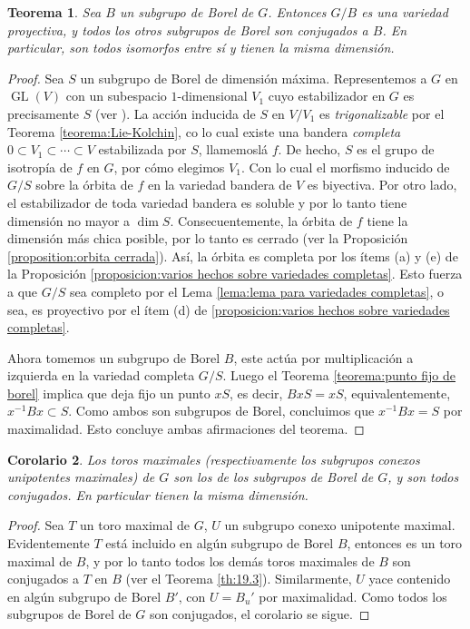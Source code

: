 \documentclass[spanish,10pt]{amsart}
\newtheorem{theorem}{Teorema}[section]
\newtheorem{corollary}[theorem]{Corolario}
\theoremstyle{definition}
\theoremstyle{remark}
\numberwithin{equation}{section}
\begin{document}
\begin{theorem}\label{teorema:los subgrupos de borel son conjugados y G/B es una variedad proyectiva}
Sea $B$ un subgrupo de Borel de $G$. Entonces $G/B$ es una variedad proyectiva, y todos los otros subgrupos de Borel son conjugados a $B$. En particular, son todos isomorfos entre sí y tienen la misma dimensión.
\end{theorem}
\begin{proof}
Sea $S$ un subgrupo de Borel de dimensión máxima. Representemos a $G$ en $\operatorname{GL} (V)$ con un subespacio $1$-dimensional $V_1$ cuyo estabilizador en $G$ es precisamente $S$ (ver \cite[Teorema 11.2]{humphreys2012linearAlgebraicGroups}). La acción inducida de $S$ en $V/V_1$ es \textit{trigonalizable} por el Teorema \ref{teorema:Lie-Kolchin}, co lo cual existe una bandera \textit{completa} $0 \subset V_1 \subset \cdots \subset V$ estabilizada por $S$, llamemoslá $f$. De hecho, $S$ es el grupo de isotropía de $f$ en $G$, por cómo elegimos $V_1$. Con lo cual el morfismo inducido de $G/S$ sobre la órbita de $f$ en la variedad bandera de $V$ es biyectiva. Por otro lado, el estabilizador de toda variedad bandera es soluble y por lo tanto tiene dimensión no mayor a $\dim S$. Consecuentemente, la órbita de $f$ tiene la dimensión más chica posible, por lo tanto es cerrado (ver la Proposición \ref{proposition:orbita cerrada}). Así, la órbita es completa por los ítems (a) y (e) de la Proposición \ref{proposicion:varios hechos sobre variedades completas}. Esto fuerza a que $G/S$ sea completo por el Lema \ref{lema:lema para variedades completas}, o sea, es proyectivo por el ítem (d) de \ref{proposicion:varios hechos sobre variedades completas}.

Ahora tomemos un subgrupo de Borel $B$, este actúa por multiplicación a izquierda en la variedad completa $G/S$. Luego el Teorema \ref{teorema:punto fijo de borel} implica que deja fijo un punto $xS$, es decir, $BxS = xS$, equivalentemente, $x^{-1} B x \subset S$. Como ambos son subgrupos de Borel, concluimos que $x^{-1} B x = S$ por maximalidad. Esto concluye ambas afirmaciones del teorema.
\end{proof}

\begin{corollary}\label{corolario:los toros maximales de G son toros maximales de un Borel y son todos conjugados entre si}
Los toros maximales (respectivamente los subgrupos conexos unipotentes maximales) de $G$ son los de los subgrupos de Borel de $G$, y son todos conjugados. En particular tienen la misma dimensión.
\end{corollary}
\begin{proof}
Sea $T$ un toro maximal de $G$, $U$ un subgrupo conexo unipotente maximal. Evidentemente $T$ está incluido en algún subgrupo de Borel $B$, entonces es un toro maximal de $B$, y por lo tanto todos los demás toros maximales de $B$ son conjugados a $T$ en $B$ (ver el Teorema \ref{th:19.3}). Similarmente, $U$ yace contenido en algún subgrupo de Borel $B'$, con $U = B_u '$ por maximalidad. Como todos los subgrupos de Borel de $G$ son conjugados, el corolario se sigue.
\end{proof}
\end{document}
